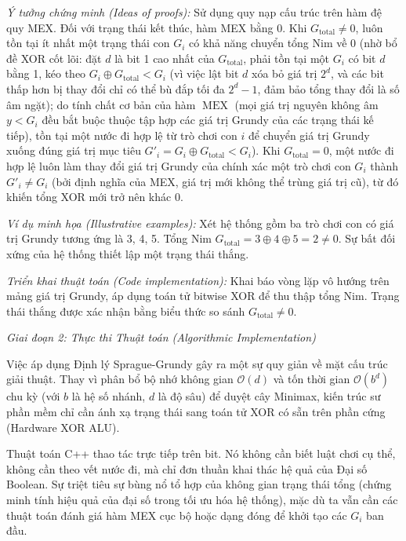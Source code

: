 \documentclass{article}
\begin{document}
\emph{Ý tưởng chứng minh (Ideas of proofs):} Sử dụng quy nạp cấu trúc trên hàm đệ quy MEX. Đối với trạng thái kết thúc, hàm MEX bằng 0. Khi $G_{\text{total}} \neq 0$, luôn tồn tại ít nhất một trạng thái con $G_i$ có khả năng chuyển tổng Nim về 0 (nhờ bổ đề XOR cốt lõi: đặt $d$ là bit 1 cao nhất của $G_{\text{total}}$, phải tồn tại một $G_i$ có bit $d$ bằng 1, kéo theo $G_i \oplus G_{\text{total}} < G_i$ (vì việc lật bit $d$ xóa bỏ giá trị $2^d$, và các bit thấp hơn bị thay đổi chỉ có thể bù đắp tối đa $2^d - 1$, đảm bảo tổng thay đổi là số âm ngặt); do tính chất cơ bản của hàm $\operatorname{MEX}$ (mọi giá trị nguyên không âm $y < G_i$ đều bắt buộc thuộc tập hợp các giá trị Grundy của các trạng thái kế tiếp), tồn tại một nước đi hợp lệ từ trò chơi con $i$ để chuyển giá trị Grundy xuống đúng giá trị mục tiêu $G'_i = G_i \oplus G_{\text{total}} < G_i$). Khi $G_{\text{total}} = 0$, một nước đi hợp lệ luôn làm thay đổi giá trị Grundy của chính xác một trò chơi con $G_i$ thành $G'_i \neq G_i$ (bởi định nghĩa của MEX, giá trị mới không thể trùng giá trị cũ), từ đó khiến tổng XOR mới trở nên khác 0.

\emph{Ví dụ minh họa (Illustrative examples):} Xét hệ thống gồm ba trò chơi con có giá trị Grundy tương ứng là 3, 4, 5. Tổng Nim $G_{\text{total}} = 3 \oplus 4 \oplus 5 = 2 \neq 0$. Sự bất đối xứng của hệ thống thiết lập một trạng thái thắng.

\emph{Triển khai thuật toán (Code implementation):} Khai báo vòng lặp vô hướng trên mảng giá trị Grundy, áp dụng toán tử bitwise XOR để thu thập tổng Nim. Trạng thái thắng được xác nhận bằng biểu thức so sánh $G_{\text{total}} \neq 0$.

\vspace{0.5em}\noindent\emph{Giai đoạn 2: Thực thi Thuật toán (Algorithmic Implementation)}

Việc áp dụng Định lý Sprague-Grundy gây ra một sự quy giản về mặt cấu trúc giải thuật. Thay vì phân bổ bộ nhớ không gian $\mathcal{O}(d)$ và tốn thời gian $\mathcal{O}(b^d)$ chu kỳ (với $b$ là hệ số nhánh, $d$ là độ sâu) để duyệt cây Minimax, kiến trúc sư phần mềm chỉ cần ánh xạ trạng thái sang toán tử XOR có sẵn trên phần cứng (Hardware XOR ALU).

Thuật toán C++ thao tác trực tiếp trên bit. Nó không cần biết luật chơi cụ thể, không cần theo vết nước đi, mà chỉ đơn thuần khai thác hệ quả của Đại số Boolean. Sự triệt tiêu sự bùng nổ tổ hợp của không gian trạng thái tổng (chứng minh tính hiệu quả của đại số trong tối ưu hóa hệ thống), mặc dù ta vẫn cần các thuật toán đánh giá hàm MEX cục bộ hoặc dạng đóng để khởi tạo các $G_i$ ban đầu.
\end{document}
